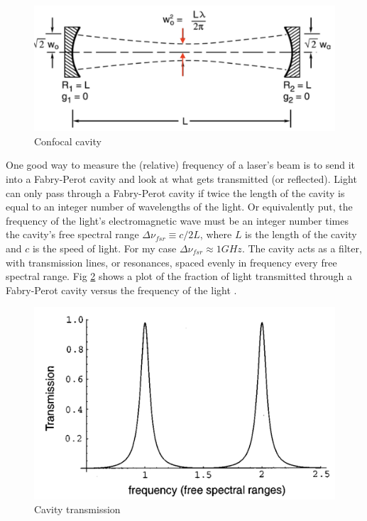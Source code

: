 \documentclass[12pt]{report}
\begin{document}
\begin{figure}[H]
    \centering
    \includegraphics[width = .8\textwidth]{confocalCavity.png}
    \caption{Confocal cavity}
    \label{fig:confocalCavity}
\end{figure}

One good way to measure the (relative) frequency of a laser's beam is to send it into a Fabry-Perot cavity and look at what gets transmitted (or reflected). Light can only pass through a Fabry-Perot cavity if twice the length of the cavity is equal to an integer number of wavelengths of the light. Or equivalently put, the frequency of the light's electromagnetic wave must be an integer number times the cavity's free spectral range $\Delta \nu_{fsr} \equiv c/2L$, where $L$ is the length of the cavity and $c$ is the speed of light. For my case $\Delta \nu_{fsr} \approx 1GHz$. The cavity acts as a filter, with transmission lines, or resonances, spaced evenly in frequency every free spectral range. Fig \ref{fig:cavityTransmission}  shows a plot of the fraction of light transmitted through a Fabry-Perot cavity versus the frequency of the light \cite{PDHintro}\cite{fundamentalsOfPhotonics}.

\begin{figure}[H]
    \centering
    \includegraphics[width=.8\textwidth]{cavityTransmission.png}
    \caption{Cavity transmission}
    \label{fig:cavityTransmission}
\end{figure}
\end{document}
